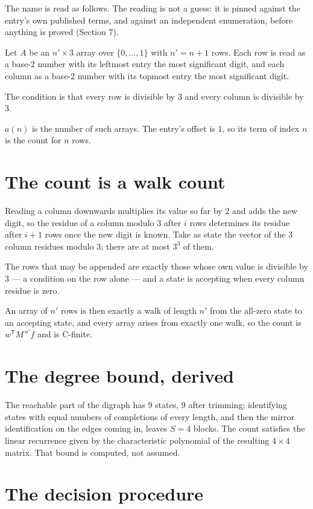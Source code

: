 \documentclass[11pt]{article}
\theoremstyle{definition}
\begin{document}
The name is read as follows. The reading is not a guess: it is pinned against the entry's own published terms, and against an independent enumeration, before anything is proved (Section 7).

Let $A$ be an $n' \times 3$ array over $\{0,\dots,1\}$ with $n' = n + 1$ rows. Each row is read as a base-$2$ number with its leftmost entry the most significant digit, and each column as a base-$2$ number with its topmost entry the most significant digit.

The condition is that every row is divisible by $3$ and every column is divisible by $3$.

$a(n)$ is the number of such arrays. The entry's offset is 1, so its term of index $n$ is the count for $n$ rows.

\section{The count is a walk count}

Reading a column downwards multiplies its value so far by $2$ and adds the new digit, so the residue of a column modulo $3$ after $i$ rows determines its residue after $i+1$ rows once the new digit is known. Take as state the vector of the $3$ column residues modulo $3$; there are at most $3^{3}$ of them.

The rows that may be appended are exactly those whose own value is divisible by $3$ --- a condition on the row alone --- and a state is accepting when every column residue is zero.

An array of $n'$ rows is then exactly a walk of length $n'$ from the all-zero state to an accepting state, and every array arises from exactly one walk, so the count is $w^{\mathsf T}M^{\,n'}f$ and is C-finite.

\section{The degree bound, derived}

The reachable part of the digraph has $9$ states, $9$ after trimming; identifying states with equal numbers of completions of every length, and then the mirror identification on the edges coming in, leaves $S = 4$ blocks. The count satisfies the linear recurrence given by the characteristic polynomial of the resulting $4\times4$ matrix. That bound is computed, not assumed.

\section{The decision procedure}
\end{document}
